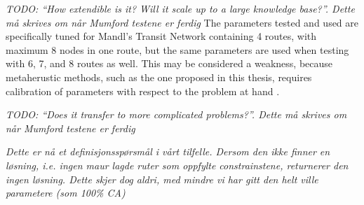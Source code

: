 \emph{\color{blue} TODO: ``How extendible is it? Will it scale up to a large knowledge base?''. Dette må skrives om når Mumford testene er ferdig}
The parameters tested and used are specifically tuned for Mandl's Transit Network containing 4 routes, with maximum 8 nodes in one route, but the same parameters are used when testing with 6, 7, and 8 routes as well. This may be considered a weakness, because metaherustic methods, such as the one proposed in this thesis, requires calibration of parameters with respect to the problem at hand \citep{dobslaw09}. 

\emph{\color{blue} TODO: ``Does it transfer to more complicated problems?''. Dette må skrives om når Mumford testene er ferdig}


\emph{\color{blue} Dette er nå et definisjonsspørsmål i vårt tilfelle. Dersom den ikke finner en løsning, i.e. ingen maur lagde ruter som oppfylte constrainstene, returnerer den ingen løsning. Dette skjer dog aldri, med mindre vi har gitt den helt ville parametere (som 100\% CA)}


